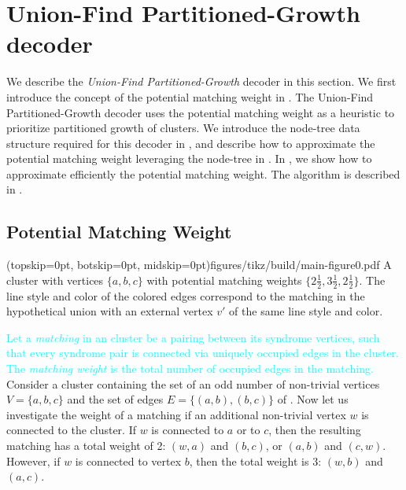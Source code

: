 \section{Union-Find Partitioned-Growth decoder}\label{sec:ufbb}
We describe the \emph{Union-Find Partitioned-Growth} decoder in this section. We first introduce the concept of the potential matching weight in . The Union-Find Partitioned-Growth decoder uses the potential matching weight as a heuristic to prioritize partitioned growth of clusters. We introduce the node-tree data structure required for this decoder in , and describe how to approximate the potential matching weight leveraging the node-tree in . In , we show how to approximate efficiently the potential matching weight. The algorithm is described in . 

\subsection{Potential Matching Weight}\label{sec:matchingweight}

\Figure[bt](topskip=0pt, botskip=0pt, midskip=0pt){figures/tikz/build/main-figure0.pdf}{
    A cluster with vertices $\{a,b,c\}$ with potential matching weights $\{2\frac{1}{2}, 3\frac{1}{2}, 2\frac{1}{2}\}$. The line style and color of the colored edges correspond to the matching in the hypothetical union with an external vertex $v'$ of the same line style and color.\label{fig0}}


\textcolor{cyan}{Let a \emph{matching} in an cluster be a pairing between its syndrome vertices, such that every syndrome pair is connected via uniquely occupied edges in the cluster. The \emph{matching weight} is the total number of occupied edges in the matching.}
Consider a cluster containing the set of an odd number of non-trivial vertices $V=\{a,b,c\}$ and the set of edges $E=\{(a,b), (b, c)\}$ of . Now let us investigate the weight of a matching if an additional non-trivial vertex $w$ is connected to the cluster. If $w$ is connected to $a$ or to $c$, then the resulting matching has a total weight of 2: $(w,a)$ and $(b,c)$, or $(a,b)$ and $(c,w)$. However, if $w$ is connected to vertex $b$, then the total weight is 3: $(w, b)$ and $(a, c)$. %

